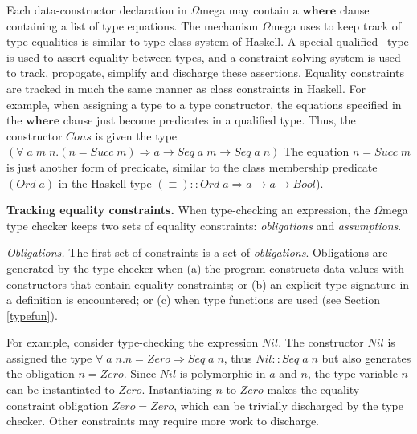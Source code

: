 \documentclass[10pt]{article}
\newcommand{\Conid}[1]{\mathit{#1}}
\newcommand{\Varid}[1]{\mathit{#1}}
\newcommand{\Wmega}{\ensuremath{\Omega}mega}
\begin{document}
Each data-constructor declaration in \Wmega{} may contain a \ensuremath{\mathbf{where}}
clause containing a list of type equations.
The mechanism \Wmega{} uses to keep track of type equalities 
is similar to type class system of Haskell.
A special qualified~\cite{J92}
type is used to assert equality between types, and a
constraint solving system is used to track, propogate, simplify and discharge these
assertions. Equality constraints are tracked in much the same manner as
class constraints in Haskell. For example, 
when assigning a type to a type constructor, the equations
specified in the \ensuremath{\mathbf{where}} clause just become predicates in a
qualified type. 
Thus, the constructor \ensuremath{\Conid{Cons}} is given the
type \ensuremath{(\forall\;\Varid{a}\;\Varid{m}\;\Varid{n}. (\Varid{n}\mathrel{=}\Conid{Succ}\;\Varid{m})\Rightarrow \Varid{a}\to \Conid{Seq}\;\Varid{a}\;\Varid{m}\to \Conid{Seq}\;\Varid{a}\;\Varid{n})}
The equation \ensuremath{\Varid{n}\mathrel{=}\Conid{Succ}\;\Varid{m}} is just another form of predicate, similar
to the class membership predicate \ensuremath{(\Conid{Ord}\;\Varid{a})} in the Haskell type \ensuremath{(\equiv )\mathbin{::}\Conid{Ord}\;\Varid{a}\Rightarrow \Varid{a}\to \Varid{a}\to \Conid{Bool}}).

{\bf Tracking equality constraints.} When type-checking an expression,
the \Wmega{} type checker keeps two sets of equality constraints:
{\em obligations} and {\em assumptions}.

{\it Obligations.} The first set of constraints is a set of
{\em obligations}.  Obligations are generated by the type-checker
when (a) the program constructs data-values with constructors
that contain equality constraints; or (b) an explicit type signature in a
definition is encountered; or (c) when type functions are used (see Section
\ref{typefun}).

For example, consider type-checking the expression \ensuremath{\Conid{Nil}}. The constructor
\ensuremath{\Conid{Nil}} is assigned the type \ensuremath{\forall\;\Varid{a}\;\Varid{n}. \Varid{n}\mathrel{=}\Conid{Zero}\Rightarrow \Conid{Seq}\;\Varid{a}\;\Varid{n}},
thus \ensuremath{\Conid{Nil}\mathbin{::}\Conid{Seq}\;\Varid{a}\;\Varid{n}} but also generates the obligation \ensuremath{\Varid{n}\mathrel{=}\Conid{Zero}}. Since \ensuremath{\Conid{Nil}} is
polymorphic in \ensuremath{\Varid{a}} and \ensuremath{\Varid{n}}, the type variable \ensuremath{\Varid{n}} can be instantiated to \ensuremath{\Conid{Zero}}.
Instantiating \ensuremath{\Varid{n}} to \ensuremath{\Conid{Zero}} makes the equality constraint obligation \ensuremath{\Conid{Zero}\mathrel{=}\Conid{Zero}},
which can be trivially discharged by the type checker. Other
constraints may require more work to discharge.
\end{document}
